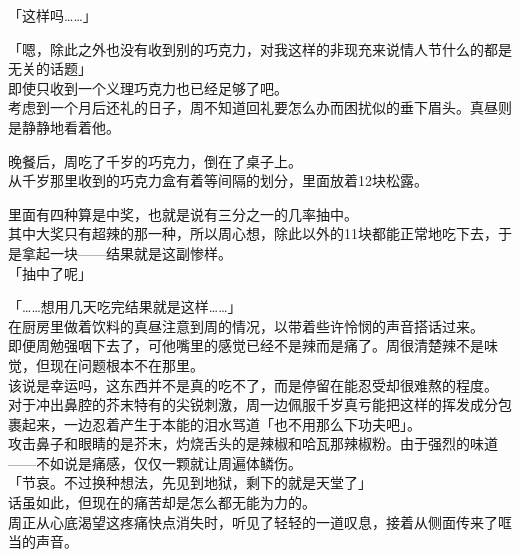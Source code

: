 「这样吗……」

「嗯，除此之外也没有收到别的巧克力，对我这样的非现充来说情人节什么的都是无关的话题」\\

即使只收到一个义理巧克力也已经足够了吧。\\

考虑到一个月后还礼的日子，周不知道回礼要怎么办而困扰似的垂下眉头。真昼则是静静地看着他。\\

\vspace{2\baselineskip}

晚餐后，周吃了千岁的巧克力，倒在了桌子上。\\

从千岁那里收到的巧克力盒有着等间隔的划分，里面放着12块松露。

里面有四种算是中奖，也就是说有三分之一的几率抽中。\\

其中大奖只有超辣的那一种，所以周心想，除此以外的11块都能正常地吃下去，于是拿起一块——结果就是这副惨样。\\

「抽中了呢」

「……想用几天吃完结果就是这样……」\\

在厨房里做着饮料的真昼注意到周的情况，以带着些许怜悯的声音搭话过来。\\

即便周勉强咽下去了，可他嘴里的感觉已经不是辣而是痛了。周很清楚辣不是味觉，但现在问题根本不在那里。\\

该说是幸运吗，这东西并不是真的吃不了，而是停留在能忍受却很难熬的程度。\\

对于冲出鼻腔的芥末特有的尖锐刺激，周一边佩服千岁真亏能把这样的挥发成分包裹起来，一边忍着产生于本能的泪水骂道「也不用那么下功夫吧」。\\

攻击鼻子和眼睛的是芥末，灼烧舌头的是辣椒和哈瓦那辣椒粉。由于强烈的味道——不如说是痛感，仅仅一颗就让周遍体鳞伤。\\

「节哀。不过换种想法，先见到地狱，剩下的就是天堂了」\\

话虽如此，但现在的痛苦却是怎么都无能为力的。\\

周正从心底渴望这疼痛快点消失时，听见了轻轻的一道叹息，接着从侧面传来了哐当的声音。\\

